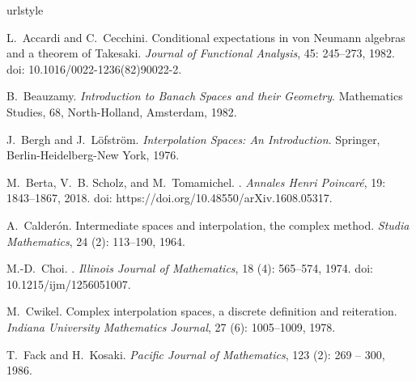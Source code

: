 \documentclass[12pt]{article}
\theoremstyle{definition}
\theoremstyle{remark}
\numberwithin{equation}{section}
\begin{document}
\begin{thebibliography}{27}
\providecommand{\url}[1]{\texttt{#1}}
\expandafter\ifx\csname urlstyle\endcsname\relax
  \providecommand{\doi}[1]{doi: #1}\else
  \providecommand{\doi}{doi: \begingroup \urlstyle{rm}\Url}\fi

L.~Accardi and C.~Cecchini.
\newblock Conditional expectations in von {Neumann} algebras and a theorem of
  {T}akesaki.
\newblock \emph{Journal of Functional Analysis}, 45: 245--273, 1982.
\newblock \doi{10.1016/0022-1236(82)90022-2}.

B.~Beauzamy.
\newblock \emph{Introduction to Banach Spaces and their Geometry}.
\newblock Mathematics Studies, 68, North-Holland, Amsterdam, 1982.

J.~Bergh and J.~L\"ofstr\"om.
\newblock \emph{Interpolation Spaces: An Introduction}.
\newblock Springer, Berlin-Heidelberg-New York, 1976.

M.~Berta, V.~B. Scholz, and M.~Tomamichel.
.
\newblock \emph{Annales Henri Poincar{\'e}}, 19: 1843--1867, 2018.
\newblock \doi{https://doi.org/10.48550/arXiv.1608.05317}.

A.~Calder\'on.
\newblock Intermediate spaces and interpolation, the complex method.
\newblock \emph{Studia Mathematics}, 24 (2): 113--190, 1964.

M.-D.~Choi.
.
\newblock \emph{Illinois Journal of Mathematics}, 18 (4):
  565--574, 1974.
\newblock \doi{10.1215/ijm/1256051007}.

M.~Cwikel.
\newblock Complex interpolation spaces, a discrete definition and reiteration.
\newblock \emph{Indiana University Mathematics Journal}, 27 (6):
  1005--1009, 1978.

T.~Fack and H.~Kosaki.
\newblock \emph{Pacific Journal of Mathematics}, 123 (2): 269
  -- 300, 1986.
  

\end{thebibliography}
\end{document}
